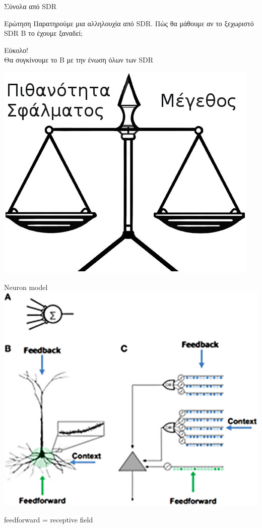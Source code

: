 \documentclass[11pt,center]{beamer}
\begin{document}

\begin{frame} {Σύνολα από SDR}
  \begin{block}{Ερώτηση}
    Παρατηρούμε μια αλληλουχία από SDR. Πώς θα μάθουμε αν το ξεχωριστό SDR Β το έχουμε ξαναδεί;
  \end{block}

  \pause
  \vspace{1em}
  Εύκολο! \\
  Θα συγκίνουμε το Β με την \alert{ένωση} όλων των SDR

  \pause
  \vspace{0.5em}
  \centering
  \includegraphics[width=.5\textwidth]{../pics/balance}
\end{frame}


\begin{frame}{Neuron model}
  \centering
  \includegraphics[width=.75\textwidth]{../pics/neuron-model}

  feedforward = receptive field
\end{frame}
\end{document}
